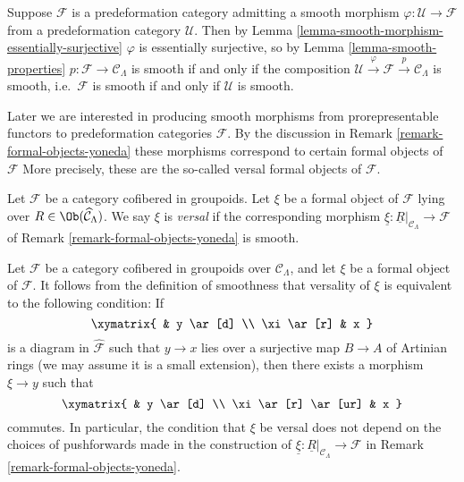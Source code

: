\begin{remark}
\label{remark-smooth-on-top}
Suppose $\mathcal{F}$ is a predeformation category admitting a smooth morphism
$\varphi : \mathcal U \to \mathcal{F}$ from a predeformation category
$\mathcal{U}$.  Then by
Lemma \ref{lemma-smooth-morphism-essentially-surjective}
$\varphi$ is essentially surjective, so by
Lemma \ref{lemma-smooth-properties}
$p: \mathcal{F} \to \mathcal{C}_\Lambda$ is smooth if and only if the
composition $\mathcal U \xrightarrow{\varphi} \mathcal{F} \xrightarrow{p}
\mathcal{C}_\Lambda$ is smooth, i.e.\ $\mathcal{F}$ is smooth if and only if
$\mathcal{U}$ is smooth.
\end{remark}

\noindent
Later we are interested in producing smooth morphisms from
prorepresentable functors to predeformation categories $\mathcal{F}$.
By the discussion in
Remark \ref{remark-formal-objects-yoneda}
these morphisms correspond to certain formal objects of $\mathcal{F}$
More precisely, these are the so-called versal formal objects of $\mathcal{F}$.

\begin{definition}
\label{definition-versal}
Let $\mathcal{F}$ be a category cofibered in groupoids.  Let $\xi$ be a formal
object of $\mathcal{F}$ lying over $R \in \Ob(\widehat{\mathcal{C}}_\Lambda)$.
We say $\xi$ is {\it versal} if the corresponding morphism
$\underline{\xi}: \underline{R}|_{\mathcal{C}_\Lambda} \to \mathcal{F}$
of Remark \ref{remark-formal-objects-yoneda} is smooth.
\end{definition}

\begin{remark}
\label{remark-versal-object}
Let $\mathcal{F}$ be a category cofibered in groupoids over $\mathcal
C_\Lambda$, and let $\xi$ be a formal object of $\mathcal{F}$.  It follows
from the definition of smoothness that versality of $\xi$ is equivalent to the
following condition: If
$$
\xymatrix{
& y \ar[d] \\
\xi \ar[r] & x
}
$$
is a diagram in $\widehat{\mathcal{F}}$ such that $y \to x$ lies over a
surjective map $B \to A$ of Artinian rings (we may assume it is a small
extension),  then there exists a morphism $\xi \to y$ such that
$$
\xymatrix{
& y \ar[d] \\
\xi \ar[r] \ar[ur] & x
}
$$
commutes. In particular, the condition that $\xi$ be versal does not depend on
the choices of pushforwards made in the construction of
$\underline{\xi} : \underline{R}|_{\mathcal{C}_\Lambda} \to \mathcal{F}$ in
Remark \ref{remark-formal-objects-yoneda}.
\end{remark}

